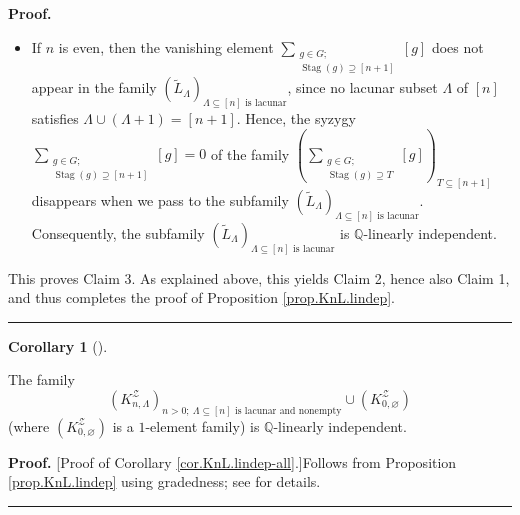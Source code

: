 \documentclass[numbers=enddot,12pt,final,onecolumn,notitlepage]{scrartcl}%
\theoremstyle{definition}
\newtheorem{coro}[theo]{Corollary}
\newenvironment{corollary}[1][]
{\begin{coro}[#1]\begin{leftbar}}
{\end{leftbar}\end{coro}}
\newenvironment{proof}[1][Proof]{\noindent\textbf{#1.} }{\ \rule{0.5em}{0.5em}}
\newenvironment{vershort}{}{}
\let\sumnonlimits\sum
\renewcommand{\sum}{\sumnonlimits\limits}
\begin{document}
\begin{proof}
\begin{itemize}
\item If $n$ is even, then the vanishing element $\sum_{\substack{g\in
G;\\\operatorname*{Stag}\left(  g\right)  \supseteq\left[  n+1\right]
}}\left[  g\right]  $ does not appear in the family $\left(  \widetilde{L}%
_{\Lambda}\right)  _{\Lambda\subseteq\left[  n\right]  \text{ is lacunar}}$,
since no lacunar subset $\Lambda$ of $\left[  n\right]  $ satisfies
$\Lambda\cup\left(  \Lambda+1\right)  =\left[  n+1\right]  $. Hence, the
syzygy $\sum_{\substack{g\in G;\\\operatorname*{Stag}\left(  g\right)
\supseteq\left[  n+1\right]  }}\left[  g\right]  =0$ of the family $\left(
\sum_{\substack{g\in G;\\\operatorname*{Stag}\left(  g\right)  \supseteq
T}}\left[  g\right]  \right)  _{T\subseteq\left[  n+1\right]  }$ disappears
when we pass to the subfamily $\left(  \widetilde{L}_{\Lambda}\right)
_{\Lambda\subseteq\left[  n\right]  \text{ is lacunar}}$. Consequently, the
subfamily $\left(  \widetilde{L}_{\Lambda}\right)  _{\Lambda\subseteq\left[
n\right]  \text{ is lacunar}}$ is $\mathbb{Q}$-linearly independent.
\end{itemize}

This proves Claim 3. As explained above, this yields Claim 2, hence also Claim
1, and thus completes the proof of Proposition \ref{prop.KnL.lindep}.
\end{proof}

\begin{corollary}
\label{cor.KnL.lindep-all}The family%
\[
\left(  K_{n,\Lambda}^{\mathcal{Z}}\right)  _{n>0;\ \Lambda\subseteq\left[
n\right]  \text{ is lacunar and nonempty}}\cup\left(  K_{0,\varnothing
}^{\mathcal{Z}}\right)
\]
(where $\left(  K_{0,\varnothing}^{\mathcal{Z}}\right)  $ is a $1$-element
family) is $\mathbb{Q}$-linearly independent.
\end{corollary}

\begin{vershort}
\begin{proof}
[Proof of Corollary \ref{cor.KnL.lindep-all}.]Follows from Proposition
\ref{prop.KnL.lindep} using gradedness; see \cite{verlong} for details.
\end{proof}
\end{vershort}
\end{document}
